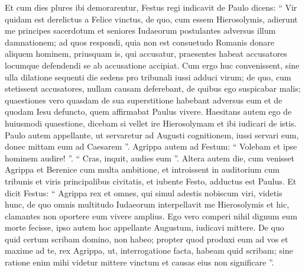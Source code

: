 \begin{biblechapter}
\begin{biblechapter}
\begin{biblechapter}
\begin{biblechapter}
\begin{biblechapter}
\begin{biblechapter}
\begin{biblechapter}
\begin{biblechapter}
\begin{biblechapter}
\begin{biblechapter}
\begin{biblechapter}
\begin{biblechapter}
\begin{biblechapter}
\begin{biblechapter}
\begin{biblechapter}
\begin{biblechapter}
\begin{biblechapter}
\begin{biblechapter}
\begin{biblechapter}
\begin{biblechapter}
\begin{biblechapter}
\begin{biblechapter}
\begin{biblechapter}
\begin{biblechapter}
\begin{biblechapter}
\verse Et cum dies plures ibi demorarentur, Festus regi indicavit de Paulo dicens: “ Vir quidam est derelictus a Felice vinctus, 
\verse de quo, cum essem Hierosolymis, adierunt me principes sacerdotum et seniores Iudaeorum postulantes adversus illum damnationem; 
\verse ad quos respondi, quia non est consuetudo Romanis donare aliquem hominem, priusquam is, qui accusatur, praesentes habeat accusatores locumque defendendi se ab accusatione accipiat. 
\verse Cum ergo huc convenissent, sine ulla dilatione sequenti die sedens pro tribunali iussi adduci virum; 
\verse de quo, cum stetissent accusatores, nullam causam deferebant, de quibus ego suspicabar malis; 
\verse quaestiones vero quasdam de sua superstitione habebant adversus eum et de quodam Iesu defuncto, quem affirmabat Paulus vivere. 
\verse Haesitans autem ego de huiusmodi quaestione, dicebam si vellet ire Hierosolymam et ibi iudicari de istis. 
\verse Paulo autem appellante, ut servaretur ad Augusti cognitionem, iussi servari eum, donec mittam eum ad Caesarem ”. 
\verse Agrippa autem ad Festum: “ Volebam et ipse hominem audire! ”. “ Cras, inquit, audies eum ”.
 \verse Altera autem die, cum venisset Agrippa et Berenice cum multa ambitione, et introissent in auditorium cum tribunis et viris principalibus civitatis, et iubente Festo, adductus est Paulus. 
\verse Et dicit Festus: “ Agrippa rex et omnes, qui simul adestis nobiscum viri, videtis hunc, de quo omnis multitudo Iudaeorum interpellavit me Hierosolymis et hic, clamantes non oportere eum vivere amplius. 
\verse Ego vero comperi nihil dignum eum morte fecisse, ipso autem hoc appellante Augustum, iudicavi mittere. 
\verse De quo quid certum scribam domino, non habeo; propter quod produxi eum ad vos et maxime ad te, rex Agrippa, ut, interrogatione facta, habeam quid scribam; 
\verse sine ratione enim mihi videtur mittere vinctum et causas eius non significare ”.
 

\end{biblechapter}
\end{biblechapter}
\end{biblechapter}
\end{biblechapter}
\end{biblechapter}
\end{biblechapter}
\end{biblechapter}
\end{biblechapter}
\end{biblechapter}
\end{biblechapter}
\end{biblechapter}
\end{biblechapter}
\end{biblechapter}
\end{biblechapter}
\end{biblechapter}
\end{biblechapter}
\end{biblechapter}
\end{biblechapter}
\end{biblechapter}
\end{biblechapter}
\end{biblechapter}
\end{biblechapter}
\end{biblechapter}
\end{biblechapter}
\end{biblechapter}
